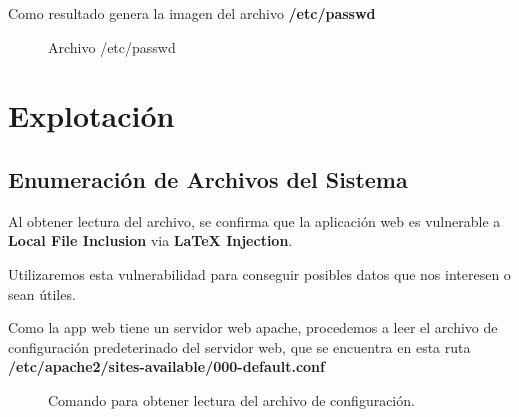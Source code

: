 \documentclass[a4paper]{article} %
\begin{document}
    \vspace{6cm}

    Como resultado genera la imagen del archivo \textbf{/etc/passwd}

    \begin{figure}[h] %
        \begin{center}
        \setlength{\fboxsep}{0.2em} %
        \end{center}
        \captionsetup{labelfont=bf} %
        \caption{Archivo /etc/passwd}
    \end{figure}

\vspace{8cm}

\section{Explotación}

    \subsection{Enumeración de Archivos del Sistema}

    \vspace{0.2cm}

    Al obtener lectura del archivo, se confirma que la aplicación web es vulnerable a \textbf{Local File Inclusion} via \textbf{LaTeX Injection}.

    Utilizaremos esta vulnerabilidad para conseguir posibles datos que nos interesen o sean útiles. 

    Como la app web tiene un servidor web apache, procedemos a leer el archivo de configuración predeterinado del servidor web, que se encuentra en esta ruta \textbf{/etc/apache2/sites-available/000-default.conf}

    \begin{figure}[h] %
        \begin{center}
        \setlength{\fboxsep}{0.2em} %
        \end{center}
        \captionsetup{labelfont=bf} %
        \caption{Comando para obtener lectura del archivo de configuración.}
    \end{figure}
\end{document}
